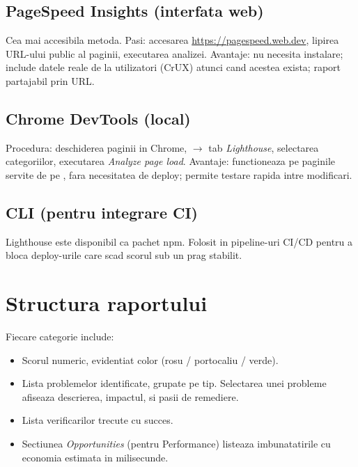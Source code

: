 \subsection{PageSpeed Insights (interfata web)}

Cea mai accesibila metoda. Pasi: accesarea \url{https://pagespeed.web.dev}, lipirea URL-ului public al paginii, executarea analizei. Avantaje: nu necesita instalare; include datele reale de la utilizatori (CrUX) atunci cand acestea exista; raport partajabil prin URL.

\subsection{Chrome DevTools (local)}

Procedura: deschiderea paginii in Chrome,  $\to$ tab \emph{Lighthouse}, selectarea categoriilor, executarea \emph{Analyze page load}. Avantaje: functioneaza pe paginile servite de pe , fara necesitatea de deploy; permite testare rapida intre modificari.

\subsection{CLI (pentru integrare CI)}

Lighthouse este disponibil ca pachet npm. Folosit in pipeline-uri CI/CD pentru a bloca deploy-urile care scad scorul sub un prag stabilit.

\section{Structura raportului}

Fiecare categorie include:

\begin{itemize}
  \item Scorul numeric, evidentiat color (rosu / portocaliu / verde).
  \item Lista problemelor identificate, grupate pe tip. Selectarea unei probleme afiseaza descrierea, impactul, si pasii de remediere.
  \item Lista verificarilor trecute cu succes.
  \item Sectiunea \emph{Opportunities} (pentru Performance) listeaza imbunatatirile cu economia estimata in milisecunde.
\end{itemize}

